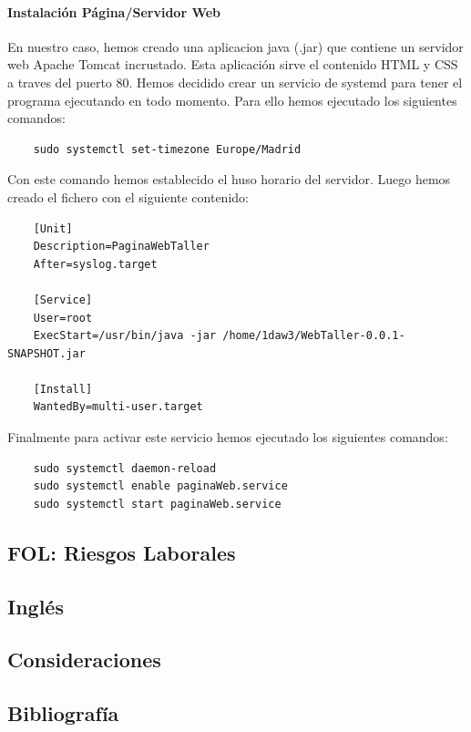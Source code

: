 \documentclass{article}
\begin{document}
{  \paragraph{Instalación Página/Servidor Web}
  En nuestro caso, hemos creado una aplicacion java (.jar) que contiene un servidor web Apache Tomcat incrustado. Esta 
  aplicación sirve el contenido HTML y CSS a traves del puerto 80. Hemos decidido crear un servicio de systemd para tener 
  el programa ejecutando en todo momento. Para ello hemos ejecutado los siguientes comandos: 
  \begin{lstlisting}
    sudo systemctl set-timezone Europe/Madrid
  \end{lstlisting}
  Con este comando hemos establecido el huso horario del servidor.
  Luego hemos creado el fichero  con el siguiente contenido: 
  \begin{lstlisting}
    [Unit]
    Description=PaginaWebTaller
    After=syslog.target

    [Service]
    User=root
    ExecStart=/usr/bin/java -jar /home/1daw3/WebTaller-0.0.1-SNAPSHOT.jar

    [Install]
    WantedBy=multi-user.target  
  \end{lstlisting}
  Finalmente para activar este servicio hemos ejecutado los siguientes comandos:
  \begin{lstlisting}
    sudo systemctl daemon-reload
    sudo systemctl enable paginaWeb.service
    sudo systemctl start paginaWeb.service
  \end{lstlisting}
}
\subsection{FOL: Riesgos Laborales}

\subsection{Inglés}
\subsection{Consideraciones}
\subsection{Bibliografía}
\end{document}
